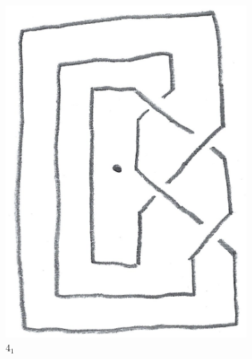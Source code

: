 \documentclass[titlepage]{article}
\numberwithin{figure}{section}
\numberwithin{table}{section}
\numberwithin{equation}{section}
\begin{document}
\begin{itemize}
\begin{figure}[h!]
        \label{fig:ex5-16}
    \end{figure}
    \begin{figure}[h!]
        \centering
        \begin{subfigure}[b]{0.2\linewidth}
            \centering
            \includegraphics[width=0.8\linewidth]{Blender/ex5-16-2a.png}
            \caption{$4_1$}
            \label{fig:ex5-16-2a}
        \end{subfigure}
        \begin{subfigure}[b]{0.2\linewidth}
            \centering

\end{subfigure}
\end{figure}
\end{itemize}
\end{document}
